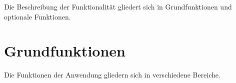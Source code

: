 
Die Beschreibung der Funktionalität gliedert sich in Grundfunktionen und optionale Funktionen.

\section{Grundfunktionen}

Die Funktionen der Anwendung gliedern sich in verschiedene Bereiche.



